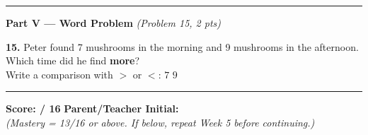 \documentclass[12pt, letterpaper]{article}
\newcommand{\answerline}{\underline{\hspace{2.5cm}}}
\newcommand{\symbox}{\fbox{\hspace{0.7cm}}}
\begin{document}
\bigskip
\noindent\textcolor{scholared}{\rule{\linewidth}{0.4pt}}

\noindent\textcolor{scholared}{\large\textbf{Part V — Word Problem}} \hfill \textit{(Problem 15, 2 pts)}

\bigskip
\noindent\textbf{15.} Peter found 7 mushrooms in the morning and 9 mushrooms in the afternoon.\\[6pt]
\hspace{1.5em}Which time did he find \textbf{more}? \hfill \answerline\\[10pt]
\hspace{1.5em}Write a comparison with $>$ or $<$: \quad $7$ \quad \symbox \quad $9$

\bigskip
\noindent\textcolor{scholared}{\rule{\linewidth}{0.4pt}}

\begin{scorebox}
\begin{center}
\textbf{Score: \answerline / 16} \hspace{2cm}
\textbf{Parent/Teacher Initial: \answerline}\\[6pt]
\textit{\small (Mastery = 13/16 or above. If below, repeat Week 5 before continuing.)}
\end{center}
\end{scorebox}
\end{document}
